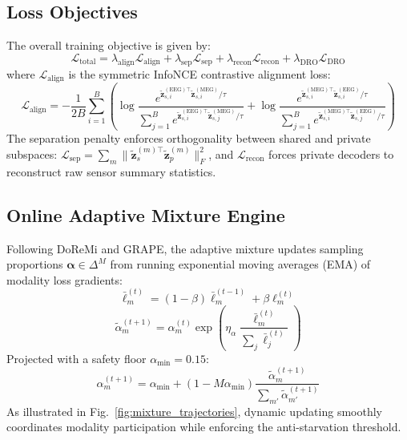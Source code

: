 \documentclass[conference]{IEEEtran}
\begin{document}
\subsection{Loss Objectives}
The overall training objective is given by:
\begin{equation}
\mathcal{L}_{\text{total}} = \lambda_{\text{align}} \mathcal{L}_{\text{align}} + \lambda_{\text{sep}} \mathcal{L}_{\text{sep}} + \lambda_{\text{recon}} \mathcal{L}_{\text{recon}} + \lambda_{\text{DRO}} \mathcal{L}_{\text{DRO}}
\end{equation}
where $\mathcal{L}_{\text{align}}$ is the symmetric InfoNCE contrastive alignment loss:
\begin{equation}
\mathcal{L}_{\text{align}} = -\frac{1}{2B} \sum_{i=1}^B \left( \log \frac{e^{\tilde{\mathbf{z}}_{s, i}^{(\text{EEG})\top} \tilde{\mathbf{z}}_{s, i}^{(\text{MEG})} / \tau}}{\sum_{j=1}^B e^{\tilde{\mathbf{z}}_{s, i}^{(\text{EEG})\top} \tilde{\mathbf{z}}_{s, j}^{(\text{MEG})} / \tau}} + \log \frac{e^{\tilde{\mathbf{z}}_{s, i}^{(\text{MEG})\top} \tilde{\mathbf{z}}_{s, i}^{(\text{EEG})} / \tau}}{\sum_{j=1}^B e^{\tilde{\mathbf{z}}_{s, i}^{(\text{MEG})\top} \tilde{\mathbf{z}}_{s, j}^{(\text{EEG})} / \tau}} \right)
\end{equation}
The separation penalty enforces orthogonality between shared and private subspaces: $\mathcal{L}_{\text{sep}} = \sum_m \|\tilde{\mathbf{z}}_{s}^{(m)\top} \tilde{\mathbf{z}}_{p}^{(m)}\|_F^2$, and $\mathcal{L}_{\text{recon}}$ forces private decoders to reconstruct raw sensor summary statistics.

\subsection{Online Adaptive Mixture Engine}
Following DoReMi and GRAPE, the adaptive mixture updates sampling proportions $\boldsymbol{\alpha} \in \Delta^M$ from running exponential moving averages (EMA) of modality loss gradients:
\begin{equation}
\bar{\ell}_m^{(t)} = (1 - \beta) \bar{\ell}_m^{(t-1)} + \beta \ell_m^{(t)}
\end{equation}
\begin{equation}
\tilde{\alpha}_m^{(t+1)} = \alpha_m^{(t)} \exp\left( \eta_\alpha \frac{\bar{\ell}_m^{(t)}}{\sum_{j} \bar{\ell}_j^{(t)}} \right)
\end{equation}
Projected with a safety floor $\alpha_{\min} = 0.15$:
\begin{equation}
\alpha_m^{(t+1)} = \alpha_{\min} + (1 - M \alpha_{\min}) \frac{\tilde{\alpha}_m^{(t+1)}}{\sum_{m'} \tilde{\alpha}_{m'}^{(t+1)}}
\end{equation}
As illustrated in Fig.~\ref{fig:mixture_trajectories}, dynamic updating smoothly coordinates modality participation while enforcing the anti-starvation threshold.
\end{document}
